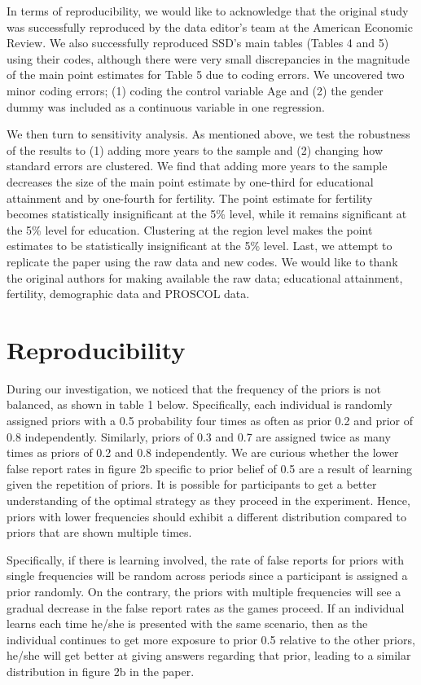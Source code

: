 \documentclass[12pt,a4paper]{article}
\begin{document}
	In terms of reproducibility, we would like to acknowledge that the original study was successfully reproduced by the data editor’s team at the American Economic Review. We also successfully reproduced SSD’s main tables (Tables 4 and 5) using their codes, although there were very small discrepancies in the magnitude of the main point estimates for Table 5 due to coding errors. We uncovered two minor coding errors; (1) coding the control variable Age and (2) the gender dummy was included as a continuous variable in one regression.
	
	We then turn to sensitivity analysis. As mentioned above, we test the robustness of the results to (1) adding more years to the sample and (2) changing how standard errors are clustered. We find that adding more years to the sample decreases the size of the main point estimate by one-third for educational attainment and by one-fourth for fertility. The point estimate for fertility becomes statistically insignificant at the 5\% level, while it remains significant at the 5\% level for education. Clustering at the region level makes the point estimates to be statistically insignificant at the 5\% level.
	Last, we attempt to replicate the paper using the raw data and new codes. We would like to thank the original authors for making available the raw data; educational attainment, fertility, demographic data and PROSCOL data.
	
	
	\section{Reproducibility}
	
	During our investigation, we noticed that the frequency of the priors is not balanced, as shown in table 1 below. Specifically, each individual is randomly assigned priors with a 0.5 probability four times as often as prior 0.2 and prior of 0.8 independently. Similarly, priors of 0.3 and 0.7 are assigned twice as many times as priors of 0.2 and 0.8 independently. We are curious whether the lower false report rates in figure 2b specific to prior belief of 0.5 are a result of learning given the repetition of priors. It is possible for participants to get a better understanding of the optimal strategy as they proceed in the experiment. Hence, priors with lower frequencies should exhibit a different distribution compared to priors that are shown multiple times.
	
	\hspace *{0mm} Specifically, if there is learning involved, the rate of false reports for priors with single frequencies will be random across periods since a participant is assigned a prior randomly. On the contrary, the priors with multiple frequencies will see a gradual decrease in the false report rates as the games proceed. If an individual learns each time he/she is presented with the same scenario, then as the individual continues to get more exposure to prior 0.5 relative to the other priors, he/she will get better at giving answers regarding that prior, leading to a similar distribution in figure 2b in the paper.
	
\end{document}

